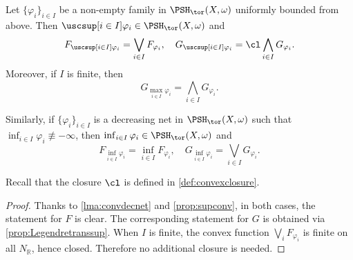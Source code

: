 \begin{proposition}\label{prop:toricseq}
    Let $\{\varphi_i\}_{i\in I}$ be a non-empty family in $\PSH_{\tor}(X,\omega)$ uniformly bounded from above. Then $\uscsup[i\in I] \varphi_i\in \PSH_{\tor}(X,\omega)$ and
    \[
    F_{\uscsup[i\in I]\varphi_i}=\bigvee_{i\in I}F_{\varphi_i},\quad G_{\uscsup[i\in I]\varphi_i}=\cl \bigwedge_{i\in I} G_{\varphi_i}.
    \]
    Moreover, if $I$ is finite, then
    \[
        G_{\max_{i\in I}\varphi_i}=\bigwedge_{i\in I} G_{\varphi_i}.
    \]

    Similarly, if $\{\varphi_i\}_{i\in I}$ is a decreasing net in $\PSH_{\tor}(X,\omega)$ such that $\inf_{i\in I}\varphi_i\not\equiv -\infty$, then $\inf_{i\in I}\varphi_i\in \PSH_{\tor}(X,\omega)$ and
    \[
    F_{\inf_{i\in I}\varphi_i}=\inf_{i\in I}F_{\varphi_i},\quad G_{\inf_{i\in I}\varphi_i}=\bigvee_{i\in I}G_{\varphi_i}.
    \]
\end{proposition}
Recall that the closure $\cl$ is defined in \cref{def:convexclosure}.
\begin{proof}
Thanks to \cref{lma:convdecnet} and \cref{prop:supconv}, in both cases, the statement for $F$ is clear. The corresponding statement for $G$ is obtained via \cref{prop:Legendretranssup}. When $I$ is finite, the convex function $\bigvee_i F_{\varphi_i}$ is finite on all $N_{\mathbb R}$, hence closed. Therefore no additional closure is needed.
\end{proof}



